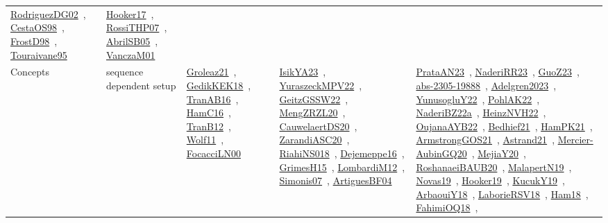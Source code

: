 {\begin{longtable}{lp{3cm}>{\raggedright\arraybackslash}p{6cm}>{\raggedright\arraybackslash}p{6cm}>{\raggedright\arraybackslash}p{8cm}}
\href{works/RodriguezDG02.pdf}{RodriguezDG02}~\cite{RodriguezDG02}, \href{works/CestaOS98.pdf}{CestaOS98}~\cite{CestaOS98}, \href{works/FrostD98.pdf}{FrostD98}~\cite{FrostD98}, \href{works/Touraivane95.pdf}{Touraivane95}~\cite{Touraivane95} & \href{works/Hooker17.pdf}{Hooker17}~\cite{Hooker17}, \href{works/RossiTHP07.pdf}{RossiTHP07}~\cite{RossiTHP07}, \href{works/AbrilSB05.pdf}{AbrilSB05}~\cite{AbrilSB05}, \href{works/VanczaM01.pdf}{VanczaM01}~\cite{VanczaM01}\\
Concepts & sequence dependent setup & \href{works/Groleaz21.pdf}{Groleaz21}~\cite{Groleaz21}, \href{works/GedikKEK18.pdf}{GedikKEK18}~\cite{GedikKEK18}, \href{works/TranAB16.pdf}{TranAB16}~\cite{TranAB16}, \href{works/HamC16.pdf}{HamC16}~\cite{HamC16}, \href{works/TranB12.pdf}{TranB12}~\cite{TranB12}, \href{works/Wolf11.pdf}{Wolf11}~\cite{Wolf11}, \href{works/FocacciLN00.pdf}{FocacciLN00}~\cite{FocacciLN00} & \href{works/IsikYA23.pdf}{IsikYA23}~\cite{IsikYA23}, \href{works/YuraszeckMPV22.pdf}{YuraszeckMPV22}~\cite{YuraszeckMPV22}, \href{works/GeitzGSSW22.pdf}{GeitzGSSW22}~\cite{GeitzGSSW22}, \href{works/MengZRZL20.pdf}{MengZRZL20}~\cite{MengZRZL20}, \href{works/CauwelaertDS20.pdf}{CauwelaertDS20}~\cite{CauwelaertDS20}, \href{works/ZarandiASC20.pdf}{ZarandiASC20}~\cite{ZarandiASC20}, \href{works/RiahiNS018.pdf}{RiahiNS018}~\cite{RiahiNS018}, \href{works/Dejemeppe16.pdf}{Dejemeppe16}~\cite{Dejemeppe16}, \href{works/GrimesH15.pdf}{GrimesH15}~\cite{GrimesH15}, \href{works/LombardiM12.pdf}{LombardiM12}~\cite{LombardiM12}, \href{works/Simonis07.pdf}{Simonis07}~\cite{Simonis07}, \href{works/ArtiguesBF04.pdf}{ArtiguesBF04}~\cite{ArtiguesBF04} & \href{works/PrataAN23.pdf}{PrataAN23}~\cite{PrataAN23}, \href{works/NaderiRR23.pdf}{NaderiRR23}~\cite{NaderiRR23}, \href{works/GuoZ23.pdf}{GuoZ23}~\cite{GuoZ23}, \href{works/abs-2305-19888.pdf}{abs-2305-19888}~\cite{abs-2305-19888}, \href{works/Adelgren2023.pdf}{Adelgren2023}~\cite{Adelgren2023}, \href{works/YunusogluY22.pdf}{YunusogluY22}~\cite{YunusogluY22}, \href{works/PohlAK22.pdf}{PohlAK22}~\cite{PohlAK22}, \href{works/NaderiBZ22a.pdf}{NaderiBZ22a}~\cite{NaderiBZ22a}, \href{works/HeinzNVH22.pdf}{HeinzNVH22}~\cite{HeinzNVH22}, \href{works/OujanaAYB22.pdf}{OujanaAYB22}~\cite{OujanaAYB22}, \href{works/Bedhief21.pdf}{Bedhief21}~\cite{Bedhief21}, \href{works/HamPK21.pdf}{HamPK21}~\cite{HamPK21}, \href{works/ArmstrongGOS21.pdf}{ArmstrongGOS21}~\cite{ArmstrongGOS21}, \href{works/Astrand21.pdf}{Astrand21}~\cite{Astrand21}, \href{works/Mercier-AubinGQ20.pdf}{Mercier-AubinGQ20}~\cite{Mercier-AubinGQ20}, \href{works/MejiaY20.pdf}{MejiaY20}~\cite{MejiaY20}, \href{works/RoshanaeiBAUB20.pdf}{RoshanaeiBAUB20}~\cite{RoshanaeiBAUB20}, \href{works/MalapertN19.pdf}{MalapertN19}~\cite{MalapertN19}, \href{works/Novas19.pdf}{Novas19}~\cite{Novas19}, \href{works/Hooker19.pdf}{Hooker19}~\cite{Hooker19}, \href{works/KucukY19.pdf}{KucukY19}~\cite{KucukY19}, \href{works/ArbaouiY18.pdf}{ArbaouiY18}~\cite{ArbaouiY18}, \href{works/LaborieRSV18.pdf}{LaborieRSV18}~\cite{LaborieRSV18}, \href{works/Ham18.pdf}{Ham18}~\cite{Ham18}, \href{works/FahimiOQ18.pdf}{FahimiOQ18}~\cite{FahimiOQ18}, 
\end{longtable}}
